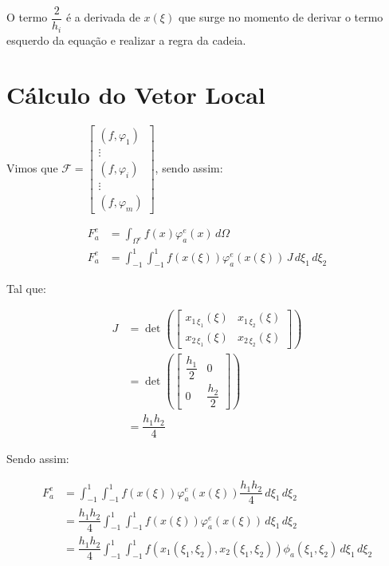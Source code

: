   O termo $\dfrac{2}{h_i}$ é a derivada de $x(\xi)$ que surge no momento de derivar o termo esquerdo da equação e realizar a regra da cadeia.

\section{Cálculo do Vetor Local}

  Vimos que $\displaystyle \mathcal{F} = \begin{bmatrix}
    (f, \varphi_1) \\ \vdots \\ (f, \varphi_i) \\ \vdots \\ (f, \varphi_m)
  \end{bmatrix}$, sendo assim:

  \begin{align*}
    F_a^e &= \int_{\Omega^e} f(x) \varphi_a^e(x) \, d\Omega \\
    F_a^e &= \int_{-1}^{1}\int_{-1}^{1} f(x(\xi)) \varphi_a^e(x(\xi)) \, J \, d\xi_1 \, d\xi_2
  \end{align*}

  Tal que:

  \begin{align*}
    J &= \det\left(\begin{bmatrix} x_{1 \, \xi_1}(\xi) & x_{1 \, \xi_2}(\xi) \\ x_{2 \, \xi_1}(\xi) & x_{2 \, \xi_2}(\xi)\end{bmatrix}\right) \\
    &= \det\left(\begin{bmatrix} \dfrac{h_1}{2} & 0 \\ 0 & \dfrac{h_2}{2} \end{bmatrix}\right) \\
    &= \dfrac{h_1h_2}{4}
  \end{align*}

  Sendo assim:

  \begin{align*}
    F_a^e &= \int_{-1}^{1}\int_{-1}^{1} f(x(\xi)) \varphi_a^e(x(\xi)) \dfrac{h_1h_2}{4} \, d\xi_1 \, d\xi_2 \\
    &= \dfrac{h_1h_2}{4} \int_{-1}^{1}\int_{-1}^{1} f(x(\xi)) \varphi_a^e(x(\xi)) \, d\xi_1 \, d\xi_2 \\
    &= \dfrac{h_1h_2}{4} \int_{-1}^{1}\int_{-1}^{1} f(x_1(\xi_1, \xi_2), x_2(\xi_1, \xi_2)) \phi_a(\xi_1, \xi_2) \, d\xi_1 \, d\xi_2
  \end{align*}

